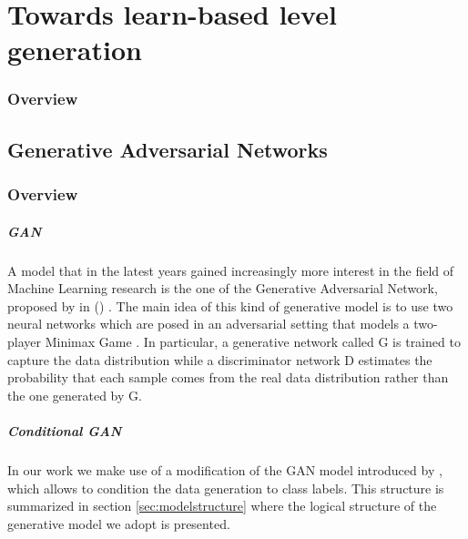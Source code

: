 \chapter{Towards learn-based level generation}
\subsection{Overview}
\section{Generative Adversarial Networks}
\subsection{Overview}

\label{sec:introgan}
\paragraph{GAN} A model that in the latest years gained increasingly more interest in the field of Machine Learning research is the one of the Generative Adversarial Network, proposed by \citeauthor{gan} in  (\citeyear{gan}) \cite{gan}. The main idea of this kind of generative model is to use two neural networks which are posed in an adversarial setting that models a two-player Minimax Game \cite[p.~276]{minimax}. In particular, a generative network called G is trained to capture the data distribution while a discriminator network D estimates the probability that each sample comes from the real data distribution rather than the one generated by G.
\paragraph{Conditional GAN} In our work we make use of a modification of the GAN model introduced by \citeauthor{conditionalgan} \cite{conditionalgan}, which allows to condition the data generation to class labels. This structure is summarized in section \ref{sec:modelstructure} where the logical structure of the generative model we adopt is presented.

